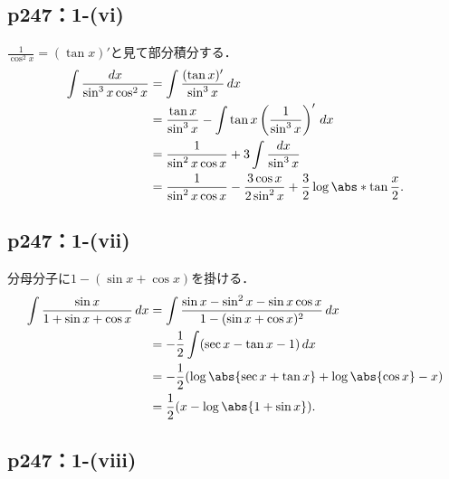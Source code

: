 \documentclass[uplatex,dvipdfmx,a4paper,10pt,fleqn]{jsarticle}
\begin{document}
\subsection*{p247：1-(vi)}


    \begin{leftbar}
        $\frac{1}{\cos^2 x} = (\tan x)'$と見て部分積分する．
        \begin{align*}
          \int \frac{dx}{\sin^3 x \cos^2 x}
          &= \int \frac{(\tan x)'}{\sin^3 x} \,dx \\
          &= \frac{\tan x}{\sin^3 x} - \int \tan x \left(\frac{1}{\sin^3 x}\right)' \,dx \\
          &= \frac{1}{\sin^2 x \cos x} + 3 \int \frac{dx}{\sin^3 x} \\
          &= \frac{1}{\sin^2 x \cos x} - \frac{3 \cos x}{2 \sin^2 x} + \frac{3}{2} \log \abs*{\tan \frac{x}{2}}.
        \end{align*}
      \end{leftbar}


      \subsection*{p247：1-(vii)}

    \begin{leftbar}
        分母分子に$1-(\sin x + \cos x)$を掛ける．
        \begin{align*}
          \int \frac{\sin x}{1 + \sin x + \cos x} \,dx
          &= \int \frac{\sin x - \sin^2 x - \sin x\cos x}{1-(\sin x + \cos x)^2} \,dx \\
          &= -\frac{1}{2} \int (\sec x - \tan x - 1) \,dx \\
          &= -\frac{1}{2}(\log \abs{\sec x + \tan x} + \log \abs{\cos x} - x) \\
          &= \frac{1}{2}(x - \log \abs{1 + \sin x}).
        \end{align*}
      \end{leftbar}

\subsection*{p247：1-(viii)}
\end{document}
